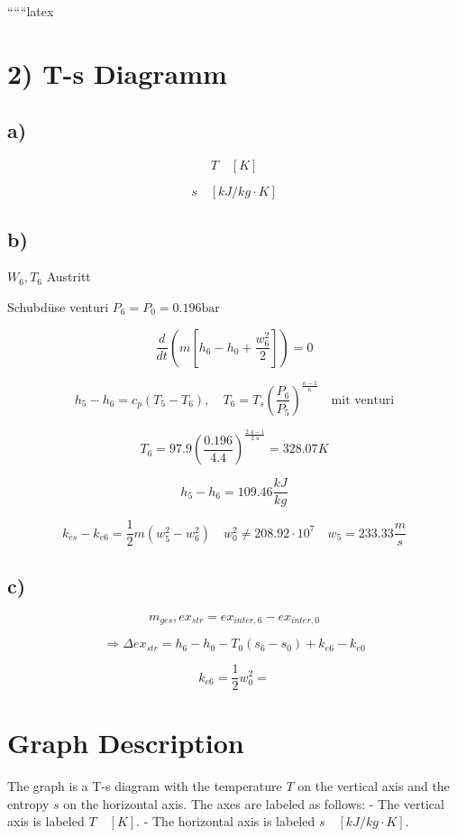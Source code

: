 
``````latex


\section*{2) T-s Diagramm}

\subsection*{a)}
\[
T \quad [K]
\]

\[
s \quad [kJ/kg \cdot K]
\]

\subsection*{b)}
$W_6, T_6$ Austritt

Schubdüse venturi $P_6 = P_0 = 0.196 \text{bar}$

\[
\frac{d}{dt} \left( m \left[ h_6 - h_0 + \frac{w_6^2}{2} \right] \right) = 0
\]

\[
h_5 - h_6 = c_p (T_5 - T_6), \quad T_6 = T_s \left( \frac{P_6}{P_5} \right)^{\frac{\kappa - 1}{\kappa}} \quad \text{mit venturi}
\]

\[
T_6 = 97.9 \left( \frac{0.196}{4.4} \right)^{\frac{2.4 - 1}{2.4}} = 328.07 K
\]

\[
h_5 - h_6 = 109.46 \frac{kJ}{kg}
\]

\[
k_{es} - k_{e6} = \frac{1}{2} m \left( w_5^2 - w_6^2 \right) \quad w_0^2 \neq 208.92 \cdot 10^7 \quad w_5 = 233.33 \frac{m}{s}
\]

\subsection*{c)}
\[
m_{ges}, ex_{str} = ex_{inter,6} - ex_{inter,0}
\]

\[
\Rightarrow \Delta ex_{str} = h_6 - h_0 - T_0 (s_6 - s_0) + k_{e6} - k_{e0}
\]

\[
k_{e6} = \frac{1}{2} w_0^2 =
\]

\newpage

\section*{Graph Description}

The graph is a T-s diagram with the temperature $T$ on the vertical axis and the entropy $s$ on the horizontal axis. The axes are labeled as follows:
- The vertical axis is labeled $T \quad [K]$.
- The horizontal axis is labeled $s \quad [kJ/kg \cdot K]$.

